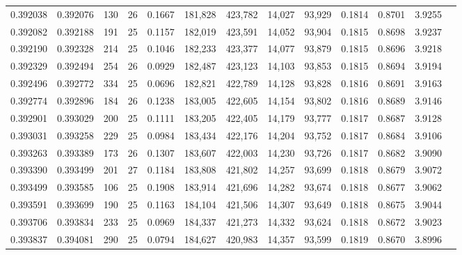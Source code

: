 \begin{tabular}{rrrrrrrrrrrrr}
0.392038 & 0.392076 & 130 &  26 &                                     0.1667 & 181,828 & 423,782 &  14,027 &  93,929 & 0.1814 & 0.8701 & 3.9255 \\
0.392082 & 0.392188 & 191 &  25 &                                     0.1157 & 182,019 & 423,591 &  14,052 &  93,904 & 0.1815 & 0.8698 & 3.9237 \\
0.392190 & 0.392328 & 214 &  25 &                                     0.1046 & 182,233 & 423,377 &  14,077 &  93,879 & 0.1815 & 0.8696 & 3.9218 \\
0.392329 & 0.392494 & 254 &  26 &                                     0.0929 & 182,487 & 423,123 &  14,103 &  93,853 & 0.1815 & 0.8694 & 3.9194 \\
0.392496 & 0.392772 & 334 &  25 &                                     0.0696 & 182,821 & 422,789 &  14,128 &  93,828 & 0.1816 & 0.8691 & 3.9163 \\
0.392774 & 0.392896 & 184 &  26 &                                     0.1238 & 183,005 & 422,605 &  14,154 &  93,802 & 0.1816 & 0.8689 & 3.9146 \\
0.392901 & 0.393029 & 200 &  25 &                                     0.1111 & 183,205 & 422,405 &  14,179 &  93,777 & 0.1817 & 0.8687 & 3.9128 \\
0.393031 & 0.393258 & 229 &  25 &                                     0.0984 & 183,434 & 422,176 &  14,204 &  93,752 & 0.1817 & 0.8684 & 3.9106 \\
0.393263 & 0.393389 & 173 &  26 &                                     0.1307 & 183,607 & 422,003 &  14,230 &  93,726 & 0.1817 & 0.8682 & 3.9090 \\
0.393390 & 0.393499 & 201 &  27 &                                     0.1184 & 183,808 & 421,802 &  14,257 &  93,699 & 0.1818 & 0.8679 & 3.9072 \\
0.393499 & 0.393585 & 106 &  25 &                                     0.1908 & 183,914 & 421,696 &  14,282 &  93,674 & 0.1818 & 0.8677 & 3.9062 \\
0.393591 & 0.393699 & 190 &  25 &                                     0.1163 & 184,104 & 421,506 &  14,307 &  93,649 & 0.1818 & 0.8675 & 3.9044 \\
0.393706 & 0.393834 & 233 &  25 &                                     0.0969 & 184,337 & 421,273 &  14,332 &  93,624 & 0.1818 & 0.8672 & 3.9023 \\
0.393837 & 0.394081 & 290 &  25 &                                     0.0794 & 184,627 & 420,983 &  14,357 &  93,599 & 0.1819 & 0.8670 & 3.8996 \\

\end{tabular}
